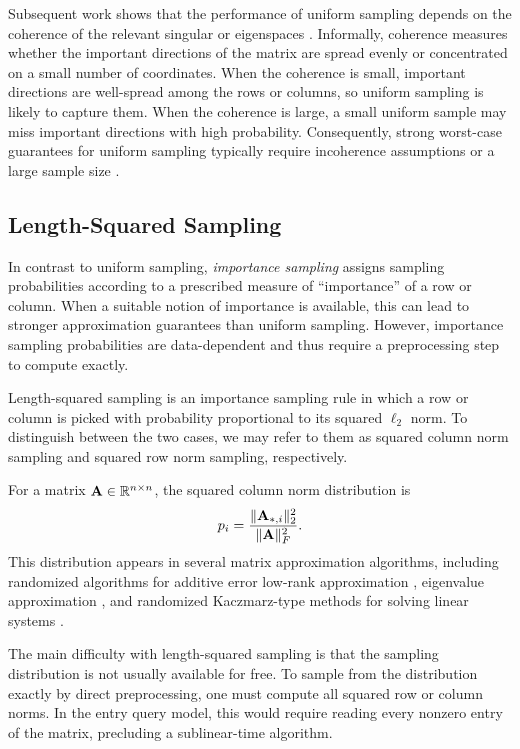 Subsequent work shows that the performance of uniform sampling depends on the coherence of the relevant singular or eigenspaces \cite{talwalkar_matrix_2010, gittens_spectral_2011}. Informally, coherence measures whether the important directions of the matrix are spread evenly or concentrated on a small number of coordinates. When the coherence is small, important directions are well-spread among the rows or columns, so uniform sampling is likely to capture them. When the coherence is large, a small uniform sample may miss important directions with high probability. Consequently, strong worst-case guarantees for uniform sampling typically require incoherence assumptions or a large sample size \cite{kumar_sampling_2012}.


\subsection{Length-Squared Sampling}

In contrast to uniform sampling, \textit{importance sampling} assigns sampling probabilities according to a prescribed measure of “importance” of a row or column. When a suitable notion of importance is available, this can lead to stronger approximation guarantees than uniform sampling. However, importance sampling probabilities are data-dependent and thus require a preprocessing step to compute exactly. 

Length-squared sampling is an importance sampling rule in which a row or column is picked with probability proportional to its squared $\ell_2$ norm. To distinguish between the two cases, we may refer to them as squared column norm sampling and squared row norm sampling, respectively.

For a matrix $\mathbf{A}\in\mathbb{R}^{n\times n}$, the squared column norm distribution is
\[
    p_i
    =
    \frac{\|\mathbf{A}_{*,i}\|_2^2}{\|\mathbf{A}\|_F^2}.
\]
This distribution appears in several matrix approximation algorithms, including randomized algorithms for additive error low-rank approximation \cite{frieze_fast_2004}, eigenvalue approximation \cite{bhattacharjee_sublinear_2022, swartworth_tight_2024}, and randomized Kaczmarz-type methods for solving linear systems \cite{needell_stochastic_2015}.

The main difficulty with length-squared sampling is that the sampling distribution is not usually available for free. To sample from the distribution exactly by direct preprocessing, one must compute all squared row or column norms. In the entry query model, this would require reading every nonzero entry of the matrix, precluding a sublinear-time algorithm.

